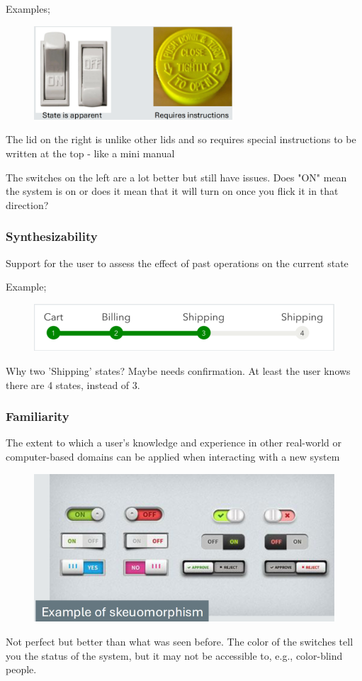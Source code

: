 \documentclass[]{project_plan}
\begin{document}
\newpage

Examples;
\begin{figure}[h!]
  \centering
  \includegraphics[width=20em]{predictability_examples.png}
\end{figure}
The lid on the right is unlike other lids and so requires special instructions to be
written at the top - like a mini manual

The switches on the left are a lot better but still have issues. Does "ON" mean
the system is on or does it mean that it will turn on once you flick it in that
direction?

\subsubsection{Synthesizability}
Support for the user to assess the effect of past operations on the current state

Example;
\begin{figure}[h!]
  \centering
  \includegraphics[width=\linewidth]{synthesizability_example.png}
\end{figure}
Why two 'Shipping' states? Maybe needs confirmation. At least the user knows
there are 4 states, instead of 3.

\subsubsection{Familiarity}
The extent to which a user’s knowledge and experience in other real-world or
computer-based domains can be applied when interacting with a new system

\begin{figure}[h!]
  \centering
  \includegraphics[width=\linewidth]{familiarity_example.png}
\end{figure}
Not perfect but better than what was seen before. The color of the switches
tell you the status of the system, but it may not be accessible to, e.g.,
color-blind people.
\end{document}

